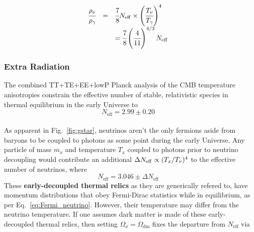 \begin{equation}
\begin{array}{lcl}
\cfrac{\rho_\nu}{\rho_\gamma} & = & \cfrac{7}{8} N_{\mathrm{eff}} \times \left( \cfrac{T_\nu}{T_\gamma} \right)^4 \\
& & = \cfrac{7}{8} \left( \cfrac{4}{11} \right)^{4/3} N_{\mathrm{eff}}
\end{array}
\end{equation}


\subsubsection{Extra Radiation}
\label{sec:extrarad}

The combined TT+TE+EE+lowP Planck analysis \citep{Planck2015} of the CMB temperature anisotropies constrain the effective number of stable, relativistic species in thermal equilibrium in the early Universe to \\
\begin{equation}
\label{eq:neff_cmb}
N_{\mathrm{eff}} = 2.99 \pm 0.20
\end{equation} \\

As apparent in Fig.~\ref{fig:gstar}, neutrinos aren't the only fermions aside from baryons to be coupled to photons as some point during the early Universe. Any particle of mass $m_x$ and temperature $T_x$ coupled to photons prior to neutrino decoupling would contribute an additional $\Delta N_{\rm{eff}} \propto (T_x/T_\nu)^4$ to the effective number of neutrinos, where 
\begin{equation}
N_{\mathrm{eff}} = 3.046 \pm \Delta N_{\mathrm{eff}}
\end{equation} These \textbf{early-decoupled thermal relics} as they are generically refered to, have momentum distributions that obey Fermi-Dirac statistics while in equilibrium, as per Eq.~\ref{eq:Fermi_neutrino}. However, their temperature may differ from the neutrino temperature. If one assumes dark matter is made of these early-decoupled thermal relics, then setting $\Omega_x = \Omega_{\mathrm{dm}}$ fixes the departure from $N_{\mathrm{eff}}$ via

